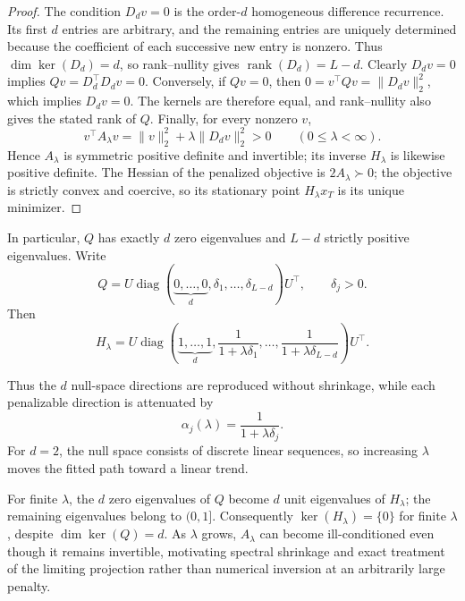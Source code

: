 \begin{proof}
The condition $D_dv=0$ is the order-$d$ homogeneous
difference recurrence. Its first $d$ entries are arbitrary, and the
remaining entries are uniquely determined because the coefficient of
each successive new entry is nonzero. Thus
$\dim\ker(D_d)=d$, so rank--nullity gives
$\operatorname{rank}(D_d)=L-d$.
Clearly $D_dv=0$ implies $Qv=D_d^\top D_dv=0$.
Conversely, if $Qv=0$, then
$0=v^\top Qv=\|D_dv\|_2^2$, which implies $D_dv=0$.
The kernels are therefore equal, and rank--nullity also gives the
stated rank of $Q$. Finally, for every nonzero $v$,
\begin{equation}
\label{eq:finite_penalty_spd}
v^\top A_\lambda v
=\|v\|_2^2+\lambda\|D_dv\|_2^2>0
\qquad(0\le\lambda<\infty).
\end{equation}
Hence $A_\lambda$ is symmetric positive definite and invertible;
its inverse $H_\lambda$ is likewise positive definite. The Hessian
of the penalized objective is $2A_\lambda\succ0$; the objective is
strictly convex and coercive, so its stationary point $H_\lambda x_T$
is its unique minimizer.
\end{proof}

In particular, $Q$ has exactly $d$ zero eigenvalues and
$L-d$ strictly positive eigenvalues. Write
\begin{equation}
\label{eq:penalty_spectral_decomposition}
Q=
U\operatorname{diag}
\left(
\underbrace{0,\ldots,0}_{d},
\delta_1,\ldots,\delta_{L-d}
\right)U^\top,
\qquad
\delta_j>0.
\end{equation}
Then
\begin{equation}
\label{eq:H_spectral}
H_\lambda
=
U\operatorname{diag}
\left(
\underbrace{1,\ldots,1}_{d},
\frac{1}{1+\lambda\delta_1},
\ldots,
\frac{1}{1+\lambda\delta_{L-d}}
\right)U^\top.
\end{equation}

Thus the $d$ null-space directions are reproduced without shrinkage, while each penalizable direction is attenuated by
\begin{equation}
\label{eq:spectral_shrinkage}
\alpha_j(\lambda)=\frac{1}{1+\lambda\delta_j}.
\end{equation}
For $d=2$, the null space consists of discrete linear sequences, so increasing $\lambda$ moves the fitted path toward a linear trend.

For finite $\lambda$, the $d$ zero eigenvalues of $Q$ become
$d$ unit eigenvalues of $H_\lambda$; the remaining eigenvalues
belong to $(0,1]$. Consequently $\ker(H_\lambda)=\{0\}$ for
finite $\lambda$, despite $\dim\ker(Q)=d$. As $\lambda$ grows,
$A_\lambda$ can become ill-conditioned even though it remains
invertible, motivating spectral shrinkage and exact treatment
of the limiting projection rather than numerical inversion
at an arbitrarily large penalty.

